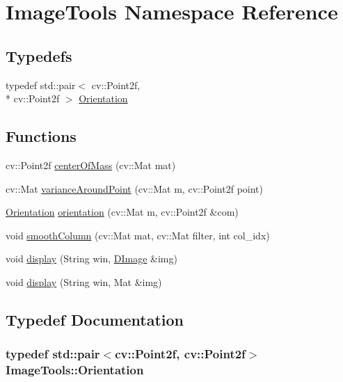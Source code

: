 \hypertarget{namespace_image_tools}{\section{Image\+Tools Namespace Reference}
\label{namespace_image_tools}
}
\subsection*{Typedefs}
\begin{DoxyCompactItemize}
\item 
typedef std\+::pair$<$ cv\+::\+Point2f, \\*
cv\+::\+Point2f $>$ \hyperlink{namespace_image_tools_ab9b6e111b7139dcff8b2b04b0f36d1a1}{Orientation}
\end{DoxyCompactItemize}
\subsection*{Functions}
\begin{DoxyCompactItemize}
\item 
cv\+::\+Point2f \hyperlink{namespace_image_tools_aef9fa361958e089c60e33af0e1ae96c4}{center\+Of\+Mass} (cv\+::\+Mat mat)
\item 
cv\+::\+Mat \hyperlink{namespace_image_tools_aef7ccc5ec3cb576256506b6539f5ad6e}{variance\+Around\+Point} (cv\+::\+Mat m, cv\+::\+Point2f point)
\item 
\hyperlink{namespace_image_tools_ab9b6e111b7139dcff8b2b04b0f36d1a1}{Orientation} \hyperlink{namespace_image_tools_ab6bb0f737969195fcfceb4723bf474ea}{orientation} (cv\+::\+Mat m, cv\+::\+Point2f \&com)
\item 
void \hyperlink{namespace_image_tools_af76b41d3be28c818faf2a9ec1e3d3bb1}{smooth\+Column} (cv\+::\+Mat mat, cv\+::\+Mat filter, int col\+\_\+idx)
\item 
void \hyperlink{namespace_image_tools_a45492e740afde5d3482a71d5cee9842b}{display} (String win, \hyperlink{class_d_image}{D\+Image} \&img)
\item 
void \hyperlink{namespace_image_tools_a00f243162ed9b7c3dc16d105425e473d}{display} (String win, Mat \&img)
\end{DoxyCompactItemize}


\subsection{Typedef Documentation}
\hypertarget{namespace_image_tools_ab9b6e111b7139dcff8b2b04b0f36d1a1}{
\subsubsection[{Orientation}]{\setlength{\rightskip}{0pt plus 5cm}typedef std\+::pair$<$cv\+::\+Point2f, cv\+::\+Point2f$>$ {\bf Image\+Tools\+::\+Orientation}}}\label{namespace_image_tools_ab9b6e111b7139dcff8b2b04b0f36d1a1}


